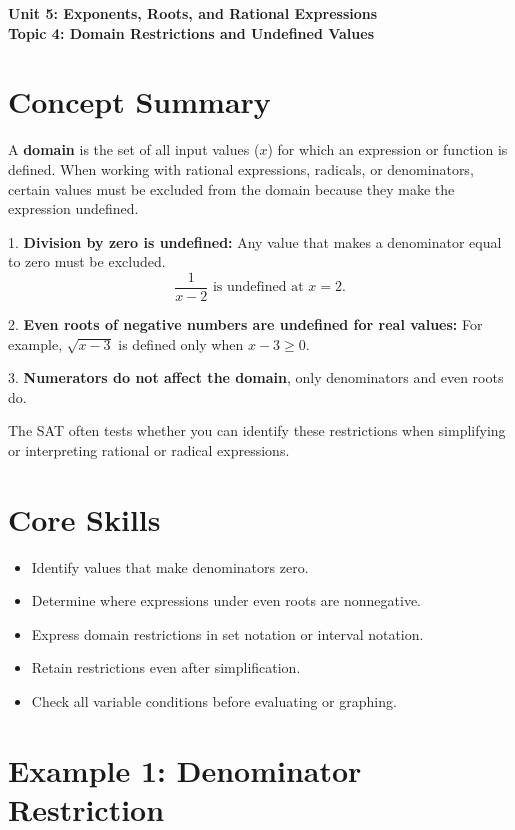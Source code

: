\documentclass[14pt]{extarticle}
\begin{document}
\raggedright
{}

\begin{center}
    \LARGE \textbf{Unit 5: Exponents, Roots, and Rational Expressions} \\[6pt]
    \Large \textbf{Topic 4: Domain Restrictions and Undefined Values}
\end{center}

\vspace{1em}

\section*{Concept Summary}

A \textbf{domain} is the set of all input values (\(x\)) for which an expression or function is defined.  
When working with rational expressions, radicals, or denominators, certain values must be excluded from the domain because they make the expression undefined.

1. \textbf{Division by zero is undefined:}
   Any value that makes a denominator equal to zero must be excluded.
   \[
   \frac{1}{x-2} \text{ is undefined at } x = 2.
   \]

2. \textbf{Even roots of negative numbers are undefined for real values:}
   For example, \(\sqrt{x-3}\) is defined only when \(x - 3 \ge 0\).

3. \textbf{Numerators do not affect the domain}, only denominators and even roots do.

The SAT often tests whether you can identify these restrictions when simplifying or interpreting rational or radical expressions.

\section*{Core Skills}
\begin{itemize}
  \item Identify values that make denominators zero.
  \item Determine where expressions under even roots are nonnegative.
  \item Express domain restrictions in set notation or interval notation.
  \item Retain restrictions even after simplification.
  \item Check all variable conditions before evaluating or graphing.
\end{itemize}

\section*{Example 1: Denominator Restriction}
\end{document}

